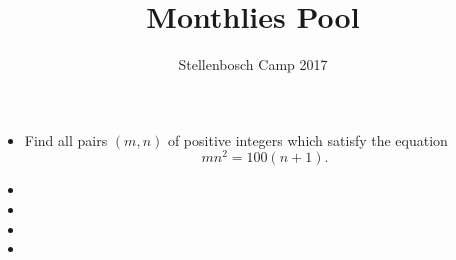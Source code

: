 \documentclass[12pt]{article}
\title{Monthlies Pool}
\author{Stellenbosch Camp 2017}
\begin{document}
 \maketitle

\begin{itemize}

\item %
Find all pairs $(m,n)$ of positive integers which satisfy the equation
  \[ mn^2 = 100(n+1). \]


\item %


\item %
 

\item %


\item %


\end{itemize}

\vfill

\centering
\begin{BVerbatim}
\end{BVerbatim}
\end{document}

